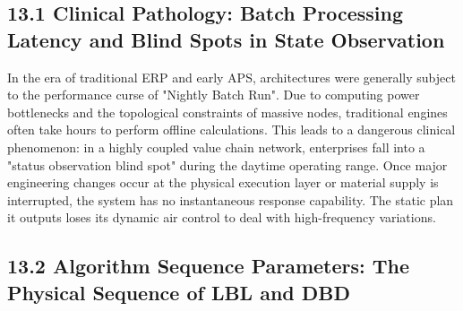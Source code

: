\documentclass[11pt,a4paper]{article}
\begin{document}
\subsection*{13.1 Clinical Pathology: Batch Processing Latency and Blind Spots in State Observation}


In the era of traditional ERP and early APS, architectures were generally subject to the performance curse of "Nightly Batch Run". Due to computing power bottlenecks and the topological constraints of massive nodes, traditional engines often take hours to perform offline calculations. This leads to a dangerous clinical phenomenon: in a highly coupled value chain network, enterprises fall into a "status observation blind spot" during the daytime operating range. Once major engineering changes occur at the physical execution layer or material supply is interrupted, the system has no instantaneous response capability. The static plan it outputs loses its dynamic air control to deal with high-frequency variations.


\subsection*{13.2 Algorithm Sequence Parameters: The Physical Sequence of LBL and DBD}
\end{document}
